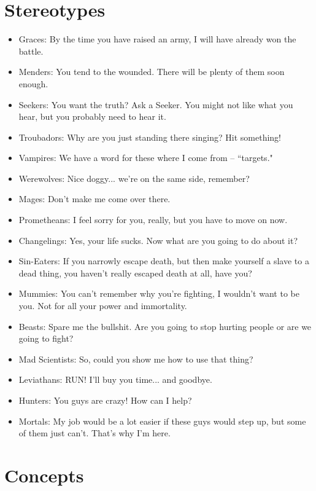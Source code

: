 \section*{Stereotypes}
\begin{itemize}
\item Graces: By the time you have raised an army, I will have already won the battle. 
\item Menders: You tend to the wounded. There will be plenty of them soon enough.
\item Seekers: You want the truth? Ask a Seeker. You might not like what you hear, but you probably need to hear it. 
\item Troubadors: Why are you just standing there singing? Hit something! 

\item Vampires: We have a word for these where I come from -- \textquotedblleft targets."
\item Werewolves: Nice doggy... we're on the same side, remember?
\item Mages: Don't make me come over there.
\item Prometheans: I feel sorry for you, really, but you have to move on now.
\item Changelings: Yes, your life sucks. Now what are you going to do about it?
\item Sin-Eaters: If you narrowly escape death, but then make yourself a slave to a dead thing, you haven't really escaped death at all, have you?
\item Mummies: You can't remember why you're fighting, I wouldn't want to be you. Not for all your power and immortality.
\item Beasts: Spare me the bullshit. Are you going to stop hurting people or are we going to fight?
\item Mad Scientists: So, could you show me how to use that thing?
\item Leviathans: RUN! I'll buy you time... and goodbye. 

\item Hunters: You guys are crazy! How can I help?
\item Mortals: My job would be a lot easier if these guys would step up, but some of them just can't. That's why I'm here. 
\end{itemize}

\section*{Concepts}

